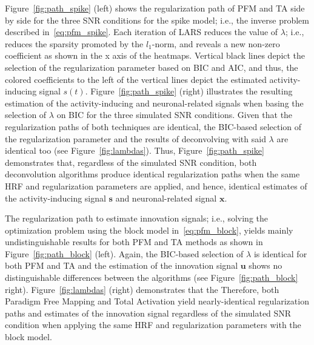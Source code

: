 Figure~\ref{fig:path_spike} (left) shows the regularization path of PFM and TA side by side for the three SNR conditions for the spike model; i.e., the inverse problem described in~\eqref{eq:pfm_spike}. Each iteration of LARS reduces the value of \(\lambda\); i.e., reduces the sparsity promoted by the \(l_1\)-norm, and reveals a new non-zero coefficient as shown in the x axis of the heatmaps. Vertical black lines depict the selection of the regularization parameter based on BIC and AIC, and thus, the colored coefficients to the left of the vertical lines depict the estimated activity-inducing signal \(s(t)\). Figure~\ref{fig:path_spike} (right) illustrates the resulting estimation of the activity-inducing and neuronal-related signals when basing the selection of \(\lambda\) on BIC for the three simulated SNR conditions. Given that the regularization paths of both techniques are identical, the BIC-based selection of the regularization parameter and the results of deconvolving with said \(\lambda\) are identical too (see Figure~\ref{fig:lambdas}). Thus, Figure~\ref{fig:path_spike} demonstrates that, regardless of the simulated SNR condition, both deconvolution algorithms produce identical regularization paths when the same HRF and regularization parameters are applied, and hence, identical estimates of the activity-inducing signal \(\mathbf{s}\) and neuronal-related signal \(\mathbf{x}\).

The regularization path to estimate innovation signals; i.e., solving the optimization problem using the block model in~\eqref{eq:pfm_block}, yields mainly undistinguishable results for both PFM and TA methods as shown in Figure~\ref{fig:path_block} (left). Again, the BIC-based selection of \(\lambda\) is identical for both PFM and TA and the estimation of the innovation signal \(\mathbf{u}\) shows no distinguishable differences between the algorithms (see Figure~\ref{fig:path_block} right). Figure~\ref{fig:lambdas} (right) demonstrates that the  Therefore, both Paradigm Free Mapping and Total Activation yield nearly-identical regularization paths and estimates of the innovation signal regardless of the simulated SNR condition when applying the same HRF and regularization parameters with the block model.
